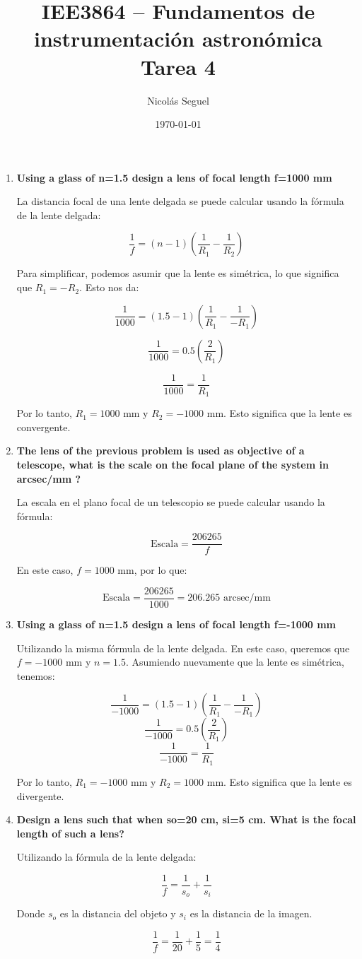 \documentclass[11pt]{article}
\title{IEE3864 – Fundamentos de instrumentación astronómica \\ \large Tarea 4}
\author{Nicolás Seguel}
\date{\today}
\begin{document}
\maketitle

\begin{enumerate}
    \item \textbf{Using a glass of n=1.5 design a lens of focal length f=1000 mm}
    
La distancia focal de una lente delgada se puede calcular usando la fórmula de la lente delgada:

\[\frac{1}{f} = (n - 1) \left( \frac{1}{R_1} - \frac{1}{R_2} \right)\]

Para simplificar, podemos asumir que la lente es simétrica, lo que significa que \(R_1 = -R_2\). Esto nos da:

\[\frac{1}{1000} = (1.5 - 1) \left( \frac{1}{R_1} - \frac{1}{-R_1} \right)\]

\[\frac{1}{1000} = 0.5 \left( \frac{2}{R_1} \right)\]

\[\frac{1}{1000} = \frac{1}{R_1}\]

Por lo tanto, \(R_1 = 1000\) mm y \(R_2 = -1000\) mm. Esto significa que la lente es convergente.

    \item \textbf{The lens of the previous problem is used as objective of a telescope, what is the scale on the focal plane of the system in arcsec/mm ?}
    
La escala en el plano focal de un telescopio se puede calcular usando la fórmula:

\[\text{Escala} = \frac{206265}{f}\]

En este caso, \(f = 1000\) mm, por lo que:

\[\text{Escala} = \frac{206265}{1000} = 206.265 \text{ arcsec/mm}\]

    \item \textbf{Using a glass of n=1.5 design a lens of focal length f=-1000 mm}

Utilizando la misma fórmula de la lente delgada. En este caso, queremos que \(f = -1000\) mm y \(n = 1.5\). Asumiendo nuevamente que la lente es simétrica, tenemos:

\[\frac{1}{-1000} = (1.5 - 1) \left( \frac{1}{R_1} - \frac{1}{-R_1} \right)\]
\[\frac{1}{-1000} = 0.5 \left( \frac{2}{R_1} \right)\]
\[\frac{1}{-1000} = \frac{1}{R_1}\]

Por lo tanto, \(R_1 = -1000\) mm y \(R_2 = 1000\) mm. Esto significa que la lente es divergente.

    \item \textbf{Design a lens such that when so=20 cm, si=5 cm. What is the focal length of such a lens?}

Utilizando la fórmula de la lente delgada:

\[\frac{1}{f} = \frac{1}{s_o} + \frac{1}{s_i}\]

Donde \(s_o\) es la distancia del objeto y \(s_i\) es la distancia de la imagen.

\[\frac{1}{f} = \frac{1}{20} + \frac{1}{5} = \frac{1}{4}\]
    

\end{enumerate}
\end{document}
